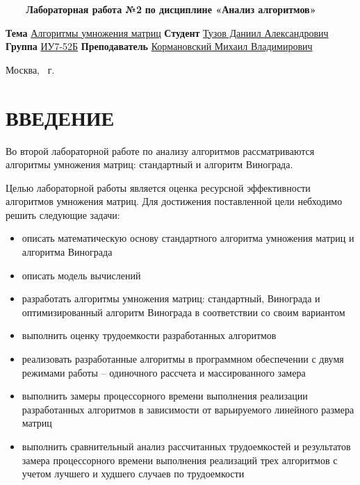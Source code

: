 \documentclass{article}
\begin{document}
\begin{titlepage}
	\noindent\begin{minipage}{1.0\textwidth}\centering
		\Large\textbf{   ~~~ Лабораторная работа №2}\newline
		\textbf{по дисциплине «Анализ алгоритмов»}\newline\newline\newline\newline\newline
	\end{minipage}

	\noindent\textbf{Тема} \underline{Алгоритмы умножения матриц}\newline\newline
	\textbf{Студент} \underline{Тузов Даниил Александрович}\newline\newline
	\textbf{Группа} \underline{ИУ7-52Б}\newline\newline
	\textbf{Преподаватель} \underline{Кормановский Михаил Владимирович}
	
	\begin{center}
		\vfill
		Москва, \the\year ~г.
	\end{center}
	\restoregeometry
	\clearpage
\end{titlepage}

\renewcommand{\contentsname}{СОДЕРЖАНИЕ} 
\tableofcontents
\setcounter{page}{2}
\clearpage

\section*{ВВЕДЕНИЕ}
Во второй лабораторной работе по анализу алгоритмов рассматриваются алгоритмы умножения матриц: стандартный и
алгоритм Винограда. 

Целью лабораторной работы является оценка ресурсной эффективности алгоритмов умножения матриц.
Для достижения поставленной цели небходимо решить следующие задачи:
\begin{itemize}
	\item описать математическую основу стандартного алгоритма умножения матриц и алгоритма Винограда
	\item описать модель вычислений
	\item разработать алгоритмы умножения матриц: стандартный, Винограда и оптимизированный алгоритм Винограда
	в соответствии со своим вариантом
	\item выполнить оценку трудоемкости разработанных алгоритмов
	\item реализовать разработанные алгоритмы в программном обеспечении с двумя режимами работы --
	одиночного рассчета и массированного замера
	\item выполнить замеры процессорного времени выполнения реализации разработанных алгоритмов в зависимости от 
	варьируемого линейного размера матриц
	\item выполнить сравнительный анализ рассчитанных трудоемкостей и результатов замера процессорного времени
	выполнения реализаций трех алгоритмов с учетом лучшего и худшего случаев по трудоемкости
\end{itemize}
\end{document}
